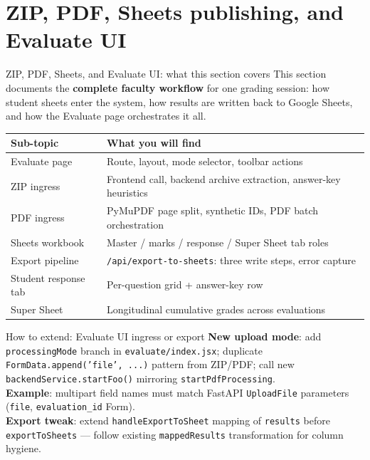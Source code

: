 \documentclass[aspectratio=169]{beamer}
\begin{document}
\section{ZIP, PDF, Sheets publishing, and Evaluate UI}

\begin{frame}{ZIP, PDF, Sheets, and Evaluate UI: what this section covers}
  \small
  This section documents the \textbf{complete faculty workflow} for one grading session:
  how student sheets enter the system, how results are written back to Google Sheets, and how the Evaluate page orchestrates it all.\\[0.4em]
  \begin{tabular}{@{}p{3.3cm}p{10.4cm}@{}}
    \toprule
    Sub-topic & What you will find \\
    \midrule
    Evaluate page & Route, layout, mode selector, toolbar actions \\
    ZIP ingress & Frontend call, backend archive extraction, answer-key heuristics \\
    PDF ingress & PyMuPDF page split, synthetic IDs, PDF batch orchestration \\
    Sheets workbook & Master / marks / response / Super Sheet tab roles \\
    Export pipeline & \texttt{/api/export-to-sheets}: three write steps, error capture \\
    Student response tab & Per-question grid + answer-key row \\
    Super Sheet & Longitudinal cumulative grades across evaluations \\
    \bottomrule
  \end{tabular}
\end{frame}

\begin{frame}{How to extend: Evaluate UI ingress or export}
  \small
  \textbf{New upload mode}: add \texttt{processingMode} branch in \texttt{evaluate/index.jsx}; duplicate \texttt{FormData.append('file', ...)} pattern from ZIP/PDF; call new \texttt{backendService.startFoo()} mirroring \texttt{startPdfProcessing}.\\
  \textbf{Example}: multipart field names must match FastAPI \texttt{UploadFile} parameters (\texttt{file}, \texttt{evaluation\_id} Form).\\
  \textbf{Export tweak}: extend \texttt{handleExportToSheet} mapping of \texttt{results} before \texttt{exportToSheets} --- follow existing \texttt{mappedResults} transformation for column hygiene.
\end{frame}
\end{document}
